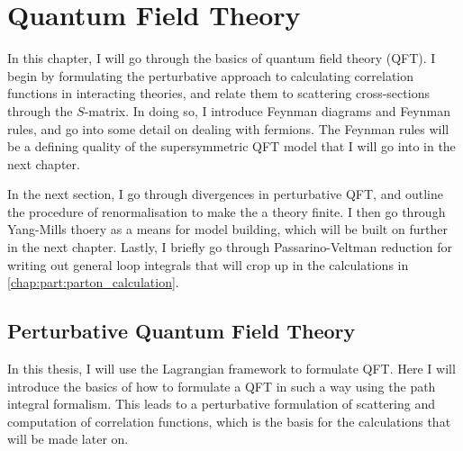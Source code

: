 \documentclass[../main.tex]{subfiles}
\begin{document}
\chapter{Quantum Field Theory}
In this chapter, I will go through the basics of quantum field theory (QFT).
I begin by formulating the perturbative approach to calculating correlation functions in interacting theories, and relate them to scattering cross-sections through the \(S\)-matrix.
In doing so, I introduce Feynman diagrams and Feynman rules, and go into some detail on dealing with fermions.
The Feynman rules will be a defining quality of the supersymmetric QFT model that I will go into in the next chapter.

In the next section, I go through divergences in perturbative QFT, and outline the procedure of renormalisation to make the a theory finite.
I then go through Yang-Mills thoery as a means for model building, which will be built on further in the next chapter.
Lastly, I briefly go through Passarino-Veltman reduction for writing out general loop integrals that will crop up in the calculations in \cref{chap:part:parton_calculation}.





\section{Perturbative Quantum Field Theory}
In this thesis, I will use the Lagrangian framework to formulate QFT\@.
Here I will introduce the basics of how to formulate a QFT in such a way using the path integral formalism.
This leads to a perturbative formulation of scattering and computation of correlation functions, which is the basis for the calculations that will be made later on.
\end{document}
